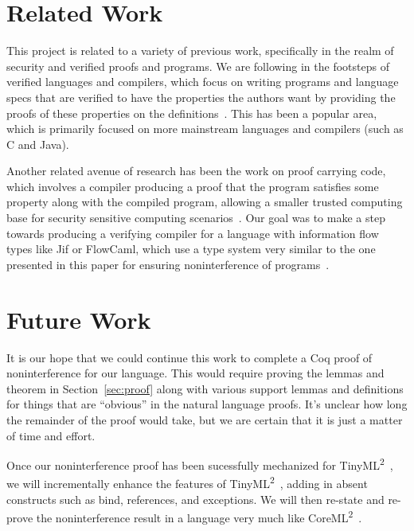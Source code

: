 \documentclass[a4paper,twocolumn]{article}
\newcommand{\langName}[0]{TinyML\textsuperscript{2}~}
\newcommand{\origLang}[0]{CoreML\textsuperscript{2}~}
\theoremstyle{plain}
\theoremstyle{definition}
\begin{document}
\section{Related Work}
\label{sec:related}

This project is related to a variety of previous work, specifically in the realm
of security and verified proofs and programs.  We are following in the footsteps
of verified languages and compilers, which focus on writing programs and
language specs that are verified to have the properties the authors want by
providing the proofs of these properties on the
definitions~\cite{strecker2002formal, leinenbach2005towards, dave2003compiler,
leroy2009formally, leroy2006formal, leroy2009formal, leroy2012compcert,
chlipala2010verified, berghofer2004extracting}.  This has been a popular area,
which is primarily focused on more mainstream languages and compilers (such as C
and Java).

Another related avenue of research has been the work on proof carrying code,
which involves a compiler producing a proof that the program satisfies some
property along with the compiled program, allowing a smaller trusted computing
base for security sensitive computing
scenarios~\cite{necula2002proof,necula1998design}.  Our goal was to make a step
towards producing a verifying compiler for a language with information flow
types like Jif or FlowCaml, which use a type system very similar to the one
presented in this paper for ensuring noninterference of
programs~\cite{InfoFlowML,myers1999jflow}.

\section{Future Work}
\label{sec:future}

It is our hope that we could continue this work to complete a Coq proof of
noninterference for our language.  This would require proving the lemmas and
theorem in Section~\ref{sec:proof} along with various support lemmas and
definitions for things that are ``obvious'' in the natural language proofs.
It's unclear how long the remainder of the proof would take, but we are certain
that it is just a matter of time and effort.

Once our noninterference proof has been sucessfully mechanized for \langName, we will incrementally enhance the features of \langName, adding in absent constructs such as bind, references, and exceptions.  We will then re-state and re-prove the noninterference result in a language very much like \origLang.
\end{document}
